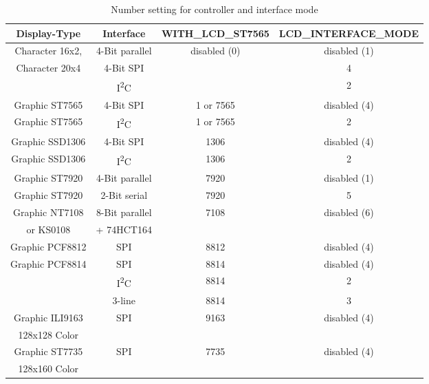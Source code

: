 \begin{description}
\begin{table}[H]
  \begin{center}
    \begin{tabular}{| c | c | c | c|}
    \hline
 Display-Type       &  Interface       & WITH\_LCD\_ST7565 &  LCD\_INTERFACE\_MODE \\
    \hline
    \hline
  Character 16x2,   & 4-Bit parallel   &  disabled (0)     & disabled (1) \\
  Character 20x4    &  4-Bit SPI       &                   &    4   \\
                  & I\textsuperscript{2}C &                &   2    \\
    \hline
  Graphic ST7565    & 4-Bit SPI        &   1 or 7565       &  disabled (4) \\
    \hline
  Graphic ST7565  & I\textsuperscript{2}C & 1 or 7565      &   2 \\
    \hline
  Graphic SSD1306   & 4-Bit SPI        &   1306            &  disabled (4) \\
    \hline
  Graphic SSD1306  & I\textsuperscript{2}C & 1306          &   2 \\
    \hline
  Graphic ST7920    & 4-Bit parallel   &   7920            &  disabled (1) \\
    \hline
  Graphic ST7920    & 2-Bit serial     &   7920            &  5 \\
    \hline
  Graphic NT7108    & 8-Bit parallel   &   7108            &  disabled (6) \\
    or KS0108       &    + 74HCT164    &                   &      \\
    \hline
  Graphic PCF8812   & SPI              &   8812            & disabled (4) \\
    \hline
  Graphic PCF8814   & SPI              &   8814            & disabled (4) \\
                  & I\textsuperscript{2}C & 8814           &   2 \\
                    & 3-line           &   8814            &   3 \\
    \hline
  Graphic ILI9163   & SPI             & 9163              & disabled (4) \\
  128x128 Color     &                 &                   &              \\
    \hline
  Graphic ST7735    & SPI             & 7735              & disabled (4) \\
  128x160 Color     &                 &                   &              \\
    \hline
    \end{tabular}
  \end{center}
  \caption{Number setting for controller and interface mode}
  \label{tab:cod-display}
\end{table}


\end{description}
